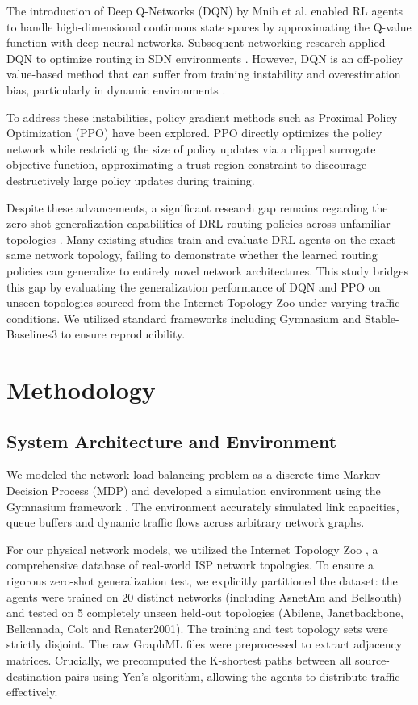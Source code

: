 \documentclass[10pt,twocolumn,letterpaper]{article}
\begin{document}
The introduction of Deep Q-Networks (DQN) by Mnih et al. \cite{mnih2015human} enabled RL agents to handle high-dimensional continuous state spaces by approximating the Q-value function with deep neural networks. Subsequent networking research applied DQN to optimize routing in SDN environments \cite{pei2024enabling}. However, DQN is an off-policy value-based method that can suffer from training instability and overestimation bias, particularly in dynamic environments \cite{van2016deep}.

To address these instabilities, policy gradient methods such as Proximal Policy Optimization (PPO) \cite{schulman2017proximal} have been explored. PPO directly optimizes the policy network while restricting the size of policy updates via a clipped surrogate objective function, approximating a trust-region constraint to discourage destructively large policy updates during training.

Despite these advancements, a significant research gap remains regarding the zero-shot generalization capabilities of DRL routing policies across unfamiliar topologies \cite{kirk2023survey}. Many existing studies train and evaluate DRL agents on the exact same network topology, failing to demonstrate whether the learned routing policies can generalize to entirely novel network architectures. This study bridges this gap by evaluating the generalization performance of DQN and PPO on unseen topologies sourced from the Internet Topology Zoo \cite{knight2011internet} under varying traffic conditions. We utilized standard frameworks including Gymnasium \cite{towers2024gymnasium} and Stable-Baselines3 \cite{raffin2021stable} to ensure reproducibility.

\section{Methodology}

\subsection{System Architecture and Environment}
We modeled the network load balancing problem as a discrete-time Markov Decision Process (MDP) and developed a simulation environment using the Gymnasium framework \cite{towers2024gymnasium}. The environment accurately simulated link capacities, queue buffers and dynamic traffic flows across arbitrary network graphs.

For our physical network models, we utilized the Internet Topology Zoo \cite{knight2011internet}, a comprehensive database of real-world ISP network topologies. To ensure a rigorous zero-shot generalization test, we explicitly partitioned the dataset: the agents were trained on 20 distinct networks (including AsnetAm and Bellsouth) and tested on 5 completely unseen held-out topologies (Abilene, Janetbackbone, Bellcanada, Colt and Renater2001). The training and test topology sets were strictly disjoint. The raw GraphML files were preprocessed to extract adjacency matrices. Crucially, we precomputed the K-shortest paths between all source-destination pairs using Yen's algorithm, allowing the agents to distribute traffic effectively.
\end{document}
